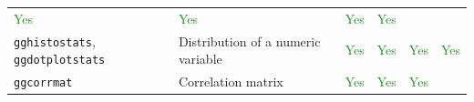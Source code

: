 \documentclass[]{article}
\begin{document}
\begin{longtable}[]{@{}llllll@{}}
\begin{minipage}[t]{0.08\columnwidth}
\textcolor{ForestGreen}{Yes}\strut
\end{minipage} & \begin{minipage}[t]{0.10\columnwidth}\raggedright
\textcolor{ForestGreen}{Yes}\strut
\end{minipage} & \begin{minipage}[t]{0.08\columnwidth}\raggedright
\textcolor{ForestGreen}{Yes}\strut
\end{minipage} & \begin{minipage}[t]{0.10\columnwidth}\raggedright
\textcolor{ForestGreen}{Yes}\strut
\end{minipage}\tabularnewline
\begin{minipage}[t]{0.14\columnwidth}\raggedright
\texttt{gghistostats}, \texttt{ggdotplotstats}\strut
\end{minipage} & \begin{minipage}[t]{0.35\columnwidth}\raggedright
Distribution of a numeric variable\strut
\end{minipage} & \begin{minipage}[t]{0.08\columnwidth}\raggedright
\textcolor{ForestGreen}{Yes}\strut
\end{minipage} & \begin{minipage}[t]{0.10\columnwidth}\raggedright
\textcolor{ForestGreen}{Yes}\strut
\end{minipage} & \begin{minipage}[t]{0.08\columnwidth}\raggedright
\textcolor{ForestGreen}{Yes}\strut
\end{minipage} & \begin{minipage}[t]{0.10\columnwidth}\raggedright
\textcolor{ForestGreen}{Yes}\strut
\end{minipage}\tabularnewline
\begin{minipage}[t]{0.14\columnwidth}\raggedright
\texttt{ggcorrmat}\strut
\end{minipage} & \begin{minipage}[t]{0.35\columnwidth}\raggedright
Correlation matrix\strut
\end{minipage} & \begin{minipage}[t]{0.08\columnwidth}\raggedright
\textcolor{ForestGreen}{Yes}\strut
\end{minipage} & \begin{minipage}[t]{0.10\columnwidth}\raggedright
\textcolor{ForestGreen}{Yes}\strut
\end{minipage} & \begin{minipage}[t]{0.08\columnwidth}\raggedright
\textcolor{ForestGreen}{Yes}\strut

\end{minipage}
\end{longtable}
\end{document}
